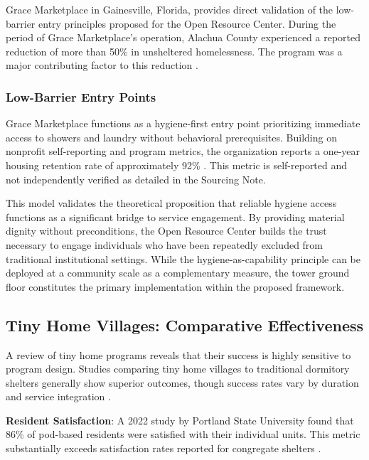 \documentclass[12pt, letterpaper]{article}
\begin{document}
Grace Marketplace in Gainesville, Florida, provides direct validation of the low-barrier entry principles proposed for the Open Resource Center. During the period of Grace Marketplace's operation, Alachua County experienced a reported reduction of more than 50\% in unsheltered homelessness. The program was a major contributing factor to this reduction \citep{grace_marketplace_2024, alachua_county_2023}.

\subsubsection{Low-Barrier Entry Points}

Grace Marketplace functions as a hygiene-first entry point prioritizing immediate access to showers and laundry without behavioral prerequisites. Building on nonprofit self-reporting and program metrics, the organization reports a one-year housing retention rate of approximately 92\% \citep{causeiq_2024}. This metric is self-reported and not independently verified as detailed in the Sourcing Note.

This model validates the theoretical proposition that reliable hygiene access functions as a significant bridge to service engagement. By providing material dignity without preconditions, the Open Resource Center builds the trust necessary to engage individuals who have been repeatedly excluded from traditional institutional settings. While the hygiene-as-capability principle can be deployed at a community scale as a complementary measure, the tower ground floor constitutes the primary implementation within the proposed framework.

\subsection{Tiny Home Villages: Comparative Effectiveness}

A review of tiny home programs reveals that their success is highly sensitive to program design. Studies comparing tiny home villages to traditional dormitory shelters generally show superior outcomes, though success rates vary by duration and service integration \citep{chj_2024}.

\textbf{Resident Satisfaction}: A 2022 study by Portland State University found that 86\% of pod-based residents were satisfied with their individual units. This metric substantially exceeds satisfaction rates reported for congregate shelters \citep{pdx_homeless_2022}.
\end{document}
